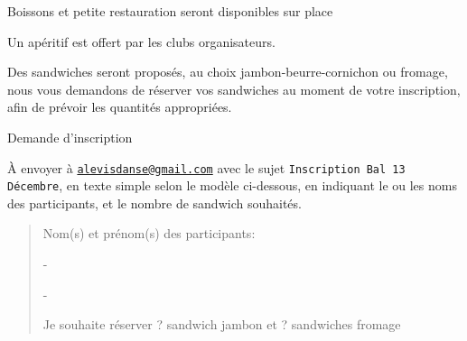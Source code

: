 \documentclass[12pt,a4paper]{article}
\begin{document}
\hrulefill
\vfill

Boissons et petite restauration seront disponibles sur place

Un apéritif est offert par les clubs organisateurs.

Des sandwiches seront proposés, au choix jambon-beurre-cornichon ou
fromage, nous vous demandons de réserver vos sandwiches au moment de
votre inscription, afin de prévoir les quantités appropriées. 

\vfill
\hrulefill
\vfill

\begin{center}
Demande d'inscription
\end{center}

À envoyer à
\href{mailto:alevisdanse@gmail.com?subject=Inscription Bal 13 Decembre}{\texttt{\color{blue}alevisdanse@gmail.com}} avec
le sujet \texttt{Inscription Bal 13 Décembre}, en texte simple selon
le modèle ci-dessous, en indiquant le ou les noms des participants, et
le nombre de sandwich souhaités.

\begin{quote}\ttfamily
Nom(s) et prénom(s) des participants:

-

-

Je souhaite réserver ? sandwich jambon et ? sandwiches fromage
\end{quote}
\end{document}
